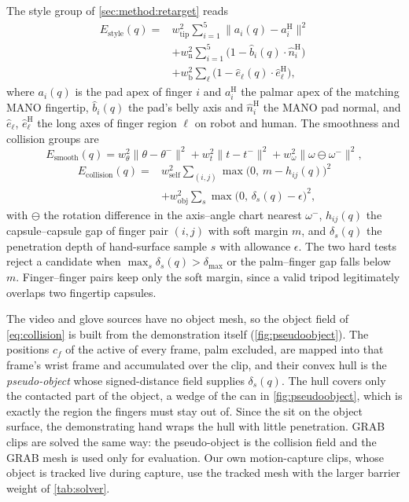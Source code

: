  The style group of \cref{sec:method:retarget} reads
\begin{equation}
\label{eq:style}
\begin{aligned}
E_{\mathrm{style}}(q) ={}& w_{\mathrm{tip}}^2 \sum_{i=1}^{5} \big\| a_i(q) - a_i^{\mathrm{H}} \big\|^2 \\
&+ w_{\mathrm{n}}^2 \sum_{i=1}^{5} \big( 1 - \hat{b}_i(q) \cdot \hat{n}_i^{\mathrm{H}} \big) \\
&+ w_{\mathrm{b}}^2 \sum_{\ell} \big( 1 - \hat{e}_\ell(q) \cdot \hat{e}_\ell^{\mathrm{H}} \big),
\end{aligned}
\end{equation}
where $a_i(q)$ is the pad apex of finger $i$ and $a_i^{\mathrm{H}}$ the palmar apex of the matching MANO fingertip, $\hat{b}_i(q)$ the pad's belly axis and $\hat{n}_i^{\mathrm{H}}$ the MANO pad normal, and $\hat{e}_\ell$, $\hat{e}_\ell^{\mathrm{H}}$ the long axes of finger region $\ell$ on robot and human. The smoothness and collision groups are
\begin{equation}
\label{eq:smooth}
E_{\mathrm{smooth}}(q) = w_{\theta}^2 \big\| \theta - \theta^{-} \big\|^2 + w_{t}^2 \big\| t - t^{-} \big\|^2 + w_{\omega}^2 \big\| \omega \ominus \omega^{-} \big\|^2,
\end{equation}
\begin{equation}
\label{eq:collision}
\begin{aligned}
E_{\mathrm{collision}}(q) ={}& w_{\mathrm{self}}^2 \sum_{(i,j)} \max\!\big(0,\, m - h_{ij}(q)\big)^2 \\
&+ w_{\mathrm{obj}}^2 \sum_{s} \max\!\big(0,\, \delta_s(q) - \epsilon\big)^2 ,
\end{aligned}
\end{equation}
with $\ominus$ the rotation difference in the axis--angle chart nearest $\omega^{-}$, $h_{ij}(q)$ the capsule--capsule gap of finger pair $(i,j)$ with soft margin $m$, and $\delta_s(q)$ the penetration depth of hand-surface sample $s$ with allowance $\epsilon$. The two hard tests reject a candidate when $\max_s \delta_s(q) > \delta_{\max}$ or the palm--finger gap falls below $m$. Finger--finger pairs keep only the soft margin, since a valid tripod legitimately overlaps two fingertip capsules.

 The video and glove sources have no object mesh, so the object field of \cref{eq:collision} is built from the demonstration itself (\cref{fig:pseudoobject}). The positions $c_f$ of the active \fcas of every frame, palm excluded, are mapped into that frame's wrist frame and accumulated over the clip, and their convex hull is the \emph{pseudo-object} whose signed-distance field supplies $\delta_s(q)$. The hull covers only the contacted part of the object, a wedge of the can in \cref{fig:pseudoobject}, which is exactly the region the fingers must stay out of. Since the \fcas sit on the object surface, the demonstrating hand wraps the hull with little penetration. GRAB clips are solved the same way: the pseudo-object is the collision field and the GRAB mesh is used only for evaluation. Our own motion-capture clips, whose object is tracked live during capture, use the tracked mesh with the larger barrier weight of \cref{tab:solver}.

